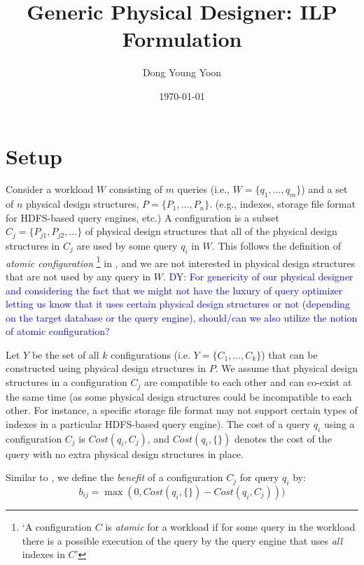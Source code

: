 \documentclass[10pt]{article}
\title{Generic Physical Designer: ILP Formulation}
\author{Dong Young Yoon}
\date{\today}
\newcommand{\dy}[1]{\textcolor{blue}{DY: #1}}
\begin{document}
\maketitle

\section{Setup}
Consider a workload $W$ consisting of $m$ queries (i.e., $W = \{q_1, \dots, q_m\}$) and a set of $n$
physical design structures, $P = \{P_1, \dots, P_n\}$. (e.g., indexes, storage file format for
HDFS-based query engines, etc.)
A configuration is a subset $C_j = \{P_{j1}, P_{j2}, \dots\}$ of physical design structures that
all of the physical design structures in $C_j$ are used by some query $q_i$ in $W$.
This follows the definition of \textit{atomic configuration}
\footnote{
`A configuration $C$ is \textit{atomic} for a workload if for some query in the workload
there is a possible execution of the query by the query engine that uses \textit{all} indexes in
$C$'
}
in \cite{chaudhuri1997efficient},
and we are not interested in physical design structures that are not used by any query in $W$.
\dy{
For genericity of our physical designer and considering the fact that we might not have the luxury
of query optimizer letting us know that it uses certain physical design structures or not (depending
on the target database or the query engine), should/can we also utilize the notion of atomic
configuration?
}

Let $Y$ be the set of all $k$ configurations (i.e. $Y = \{C_1, \dots, C_k\}$) that can be constructed
using physical design structures in $P$.
We assume that physical design structures in a configuration $C_j$ are compatible to each other and
can co-exist at the same time
(as some physical design structures could be incompatible to each other.
For instance, a specific storage file format may not support certain types of indexes in a
particular HDFS-based query engine).
The cost of a query $q_i$ using a configuration $C_j$ is $Cost(q_i, C_j)$, and $Cost(q_i, \{\})$
denotes the cost of the query with no extra physical design structures in place.

Similar to \cite{papadomanolakis2007integer}, we define the \textit{benefit} of a configuration
$C_j$ for query $q_i$ by:
\begin{equation}
 b_{ij} = \max{(0, Cost(q_i, \{\}) - Cost(q_i, C_j)))}
\end{equation}
\end{document}
